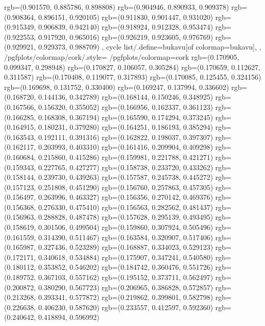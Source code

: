 {{{					rgb=(0.901570, 0.885786, 0.898808)
					rgb=(0.904946, 0.890933, 0.909378)
					rgb=(0.908364, 0.896151, 0.920105)
					rgb=(0.911830, 0.901447, 0.931020)
					rgb=(0.915349, 0.906839, 0.942140)
					rgb=(0.918924, 0.912328, 0.953474)
					rgb=(0.922553, 0.917920, 0.965016)
					rgb=(0.926219, 0.923605, 0.976769)
					rgb=(0.929921, 0.929373, 0.988709)
			},
		cycle list/.define={bukavu}{[of colormap=bukavu]},
		},
		/pgfplots/colormap/cork/.style={
			/pgfplots/colormap={cork}{%
					rgb=(0.170905, 0.099347, 0.298948)
					rgb=(0.170827, 0.106057, 0.305284)
					rgb=(0.170659, 0.112627, 0.311587)
					rgb=(0.170408, 0.119077, 0.317893)
					rgb=(0.170085, 0.125455, 0.324156)
					rgb=(0.169698, 0.131752, 0.330400)
					rgb=(0.169247, 0.137994, 0.336602)
					rgb=(0.168720, 0.144136, 0.342789)
					rgb=(0.168144, 0.150246, 0.348925)
					rgb=(0.167566, 0.156320, 0.355052)
					rgb=(0.166956, 0.162337, 0.361123)
					rgb=(0.166285, 0.168308, 0.367194)
					rgb=(0.165590, 0.174294, 0.373245)
					rgb=(0.164915, 0.180231, 0.379280)
					rgb=(0.164251, 0.186193, 0.385294)
					rgb=(0.163543, 0.192111, 0.391316)
					rgb=(0.162822, 0.198037, 0.397307)
					rgb=(0.162117, 0.203993, 0.403310)
					rgb=(0.161416, 0.209904, 0.409298)
					rgb=(0.160684, 0.215860, 0.415286)
					rgb=(0.159981, 0.221788, 0.421271)
					rgb=(0.159343, 0.227765, 0.427277)
					rgb=(0.158738, 0.233720, 0.433262)
					rgb=(0.158144, 0.239730, 0.439263)
					rgb=(0.157587, 0.245738, 0.445272)
					rgb=(0.157123, 0.251808, 0.451290)
					rgb=(0.156760, 0.257863, 0.457305)
					rgb=(0.156497, 0.263996, 0.463327)
					rgb=(0.156356, 0.270142, 0.469376)
					rgb=(0.156368, 0.276330, 0.475410)
					rgb=(0.156563, 0.282562, 0.481437)
					rgb=(0.156963, 0.288828, 0.487478)
					rgb=(0.157628, 0.295139, 0.493495)
					rgb=(0.158619, 0.301506, 0.499504)
					rgb=(0.159860, 0.307924, 0.505496)
					rgb=(0.161559, 0.314390, 0.511467)
					rgb=(0.163584, 0.320907, 0.517406)
					rgb=(0.165987, 0.327436, 0.523289)
					rgb=(0.168887, 0.334023, 0.529123)
					rgb=(0.172171, 0.340618, 0.534884)
					rgb=(0.175907, 0.347241, 0.540580)
					rgb=(0.180112, 0.353852, 0.546202)
					rgb=(0.184742, 0.360476, 0.551726)
					rgb=(0.189752, 0.367103, 0.557162)
					rgb=(0.195152, 0.373711, 0.562497)
					rgb=(0.200872, 0.380290, 0.567723)
					rgb=(0.206965, 0.386828, 0.572857)
					rgb=(0.213268, 0.393341, 0.577872)
					rgb=(0.219862, 0.399801, 0.582798)
					rgb=(0.226638, 0.406230, 0.587620)
					rgb=(0.233557, 0.412597, 0.592360)
					rgb=(0.240642, 0.418894, 0.596992)
}}}
